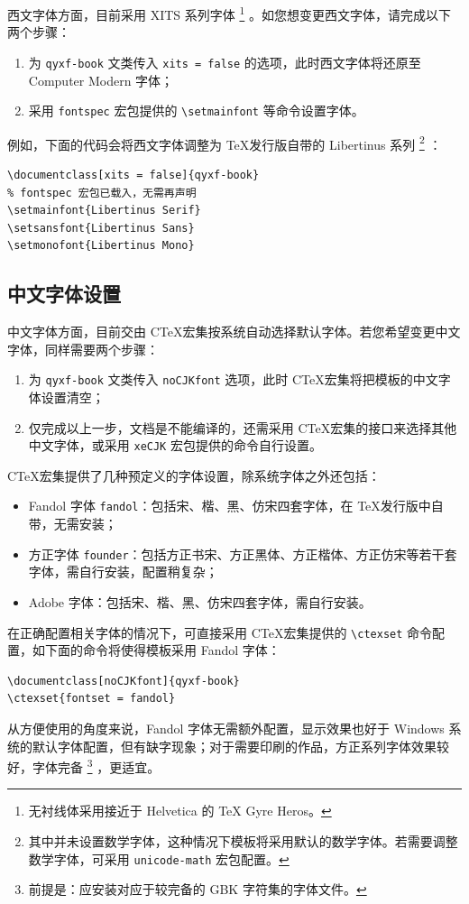 \documentclass[
  10pt,
  twoside,
  openany,
  b5paper, %
  colorscheme = basic %
]{qyxf-book}
\begin{document}
西文字体方面，目前采用 XITS 系列字体
\footnote{无衬线体采用接近于 Helvetica 的 \TeX{} Gyre Heros。}
。如您想变更西文字体，请完成以下两个步骤：

\begin{enumerate}
  \item 为 \verb|qyxf-book| 文类传入 \verb|xits = false| 的选项，此时西文字体将还原至 Computer Modern 字体；
  \item 采用 \verb|fontspec| 宏包提供的 \verb|\setmainfont| 等命令设置字体。
\end{enumerate}

例如，下面的代码会将西文字体调整为 \TeX 发行版自带的 Libertinus 系列
\footnote{其中并未设置数学字体，这种情况下模板将采用默认的数学字体。若需要调整数学字体，可采用 \texttt{unicode-math} 宏包配置。}
：

\begin{tcolorbox}
\begin{verbatim}
\documentclass[xits = false]{qyxf-book}
% fontspec 宏包已载入，无需再声明
\setmainfont{Libertinus Serif}
\setsansfont{Libertinus Sans}
\setmonofont{Libertinus Mono}
\end{verbatim}
\end{tcolorbox}

\subsection{中文字体设置}

中文字体方面，目前交由 C\TeX 宏集按系统自动选择默认字体。若您希望变更中文字体，同样需要两个步骤：
\begin{enumerate}
  \item 为 \verb|qyxf-book| 文类传入 \verb|noCJKfont| 选项，此时 C\TeX 宏集将把模板的中文字体设置清空；
  \item 仅完成以上一步，文档是不能编译的，还需采用 C\TeX 宏集的接口来选择其他中文字体，或采用 \verb|xeCJK| 宏包提供的命令自行设置。
\end{enumerate}

C\TeX 宏集提供了几种预定义的字体设置，除系统字体之外还包括：
\begin{itemize}
  \item Fandol 字体 \verb|fandol|：包括宋、楷、黑、仿宋四套字体，在 \TeX 发行版中自带，无需安装；
  \item 方正字体 \verb|founder|：包括方正书宋、方正黑体、方正楷体、方正仿宋等若干套字体，需自行安装，配置稍复杂；
  \item Adobe 字体：包括宋、楷、黑、仿宋四套字体，需自行安装。
\end{itemize}
在正确配置相关字体的情况下，可直接采用 C\TeX 宏集提供的 \verb|\ctexset| 命令配置，如下面的命令将使得模板采用 Fandol 字体：
\begin{tcolorbox}
\begin{verbatim}
\documentclass[noCJKfont]{qyxf-book}
\ctexset{fontset = fandol}
\end{verbatim}
\end{tcolorbox}
从方便使用的角度来说，Fandol 字体无需额外配置，显示效果也好于 Windows 系统的默认字体配置，但有缺字现象；对于需要印刷的作品，方正系列字体效果较好，字体完备
\footnote{前提是：应安装对应于较完备的 GBK 字符集的字体文件。}
，更适宜。
\end{document}
